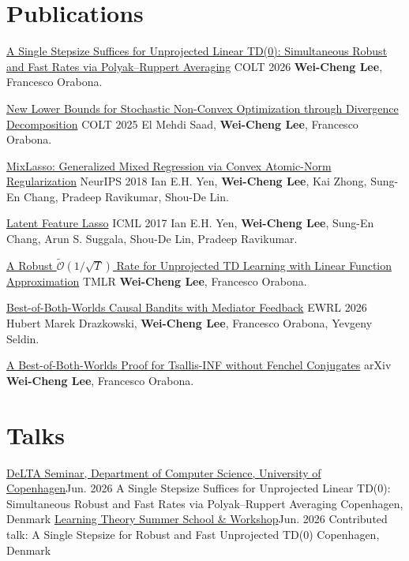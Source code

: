 \documentclass[10pt, letterpaper]{article}
\begin{document}
\section{Publications}
\paperLine
{\href{https://proceedings.mlr.press/v336/lee26d.html}{A Single Stepsize Suffices for Unprojected Linear TD(0): Simultaneous Robust and Fast Rates via Polyak--Ruppert Averaging}}
{COLT 2026}
{\textbf{Wei-Cheng Lee}, Francesco Orabona.}

\paperLine
{\href{https://proceedings.mlr.press/v291/saad25a.html}{New Lower Bounds for Stochastic Non-Convex Optimization through Divergence Decomposition}}
{COLT 2025}
{El Mehdi Saad, \textbf{Wei-Cheng Lee}, Francesco Orabona.}

\paperLine
{\href{https://proceedings.neurips.cc/paper_files/paper/2018/hash/09779bb7930c8a0a44360e12b538ae3c-Abstract.html}{MixLasso: Generalized Mixed Regression via Convex Atomic-Norm Regularization}}
{NeurIPS 2018}
{Ian E.H. Yen, \textbf{Wei-Cheng Lee}, Kai Zhong, Sung-En Chang, Pradeep Ravikumar, Shou-De Lin.}

\paperLine
{\href{https://proceedings.mlr.press/v70/yen17a.html}{Latent Feature Lasso}}
{ICML 2017}
{Ian E.H. Yen, \textbf{Wei-Cheng Lee}, Sung-En Chang, Arun S. Suggala, Shou-De Lin, Pradeep Ravikumar.}

\paperLine
{\href{https://arxiv.org/abs/2506.01052}{A Robust $\widetilde{\mathcal{O}}(1/\sqrt{T})$ Rate for Unprojected TD Learning with Linear Function Approximation}}
{TMLR}
{\textbf{Wei-Cheng Lee}, Francesco Orabona.}

\paperLine
{\href{https://openreview.net/forum?id=WR6ikPIsmt}{Best-of-Both-Worlds Causal Bandits with Mediator Feedback}}
{EWRL 2026}
{Hubert Marek Drazkowski, \textbf{Wei-Cheng Lee}, Francesco Orabona, Yevgeny Seldin.}

\paperLine
{\href{https://arxiv.org/abs/2511.11211}{A Best-of-Both-Worlds Proof for Tsallis-INF without Fenchel Conjugates}}
{arXiv}
{\textbf{Wei-Cheng Lee}, Francesco Orabona.}

\section{Talks}
\talkLine
{\href{https://di.ku.dk/english/events/event-calendar-2026/delta-seminar-by-wei-cheng-lee/}{DeLTA Seminar, Department of Computer Science, University of Copenhagen}}{Jun. 2026}
{A Single Stepsize Suffices for Unprojected Linear TD(0): Simultaneous Robust and Fast Rates via Polyak--Ruppert Averaging}
{Copenhagen, Denmark}
\talkLine
{\href{https://ltsscopenhagen.github.io/workshop/day-2/}{Learning Theory Summer School \& Workshop}}{Jun. 2026}
{Contributed talk: A Single Stepsize for Robust and Fast Unprojected TD(0)}
{Copenhagen, Denmark}
\end{document}
